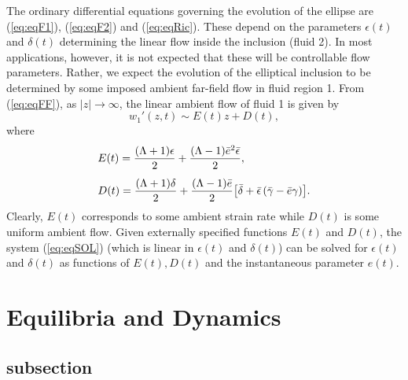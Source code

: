 \documentclass{article}
\begin{document}
The ordinary differential equations 
governing the evolution of the ellipse are (\ref{eq:eqF1}),
(\ref{eq:eqF2}) and (\ref{eq:eqRic}).
These depend on the parameters $\epsilon(t)$ and $\delta(t)$
determining the linear flow inside the inclusion (fluid 2).
In most applications, however, it is not expected
that these will be controllable flow parameters.
Rather, we expect the evolution of the elliptical inclusion to be determined
by some imposed ambient far-field flow  in fluid region 1.  From (\ref{eq:eqFF}),
as $|z| \to \infty$, the linear ambient flow of fluid 1 is given by
\begin{equation}
w_1'(z,t) \sim E(t) z + D(t),
\end{equation}
where 
\begin{eqnarray}
\begin{array}{l}
\displaystyle E(t) = {(\Lambda + 1) \epsilon \over 2} + 
{(\Lambda - 1) \bar e^2 \bar \epsilon \over 2}, \\[12pt]
\displaystyle D(t) = {(\Lambda +1) \delta \over 2}+
{(\Lambda -1) \bar e \over 2} {\left[
\bar \delta + {\bar \epsilon}
\left ( \bar \gamma - {\bar e \gamma} \right ) \right]}.
\end{array}
\label{eq:eqSOL}
\end{eqnarray}
Clearly, $E(t)$ corresponds to some ambient strain rate
while $D(t)$ is some uniform ambient flow.
Given externally specified functions $E(t)$ and $D(t)$, the system (\ref{eq:eqSOL})
(which is linear in $\epsilon(t)$ and $\delta(t)$)  can be solved for $\epsilon(t)$
and $\delta(t)$ as functions of $E(t), D(t)$ and the instantaneous parameter $e(t)$.

\section{Equilibria and Dynamics}
\subsection{subsection}
\end{document}
